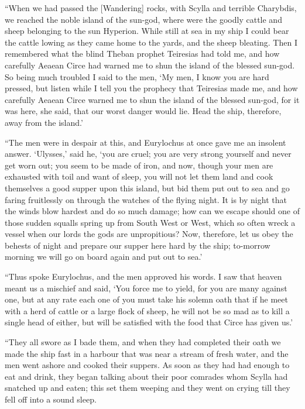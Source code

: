 “When we had passed the [Wandering] rocks, with Scylla and terrible Charybdis,
we reached the noble island of the sun-god, where were the goodly cattle and
sheep belonging to the sun Hyperion. While still at sea in my ship I could bear
the cattle lowing as they came home to the yards, and the sheep bleating. Then
I remembered what the blind Theban prophet Teiresias had told me, and how
carefully Aeaean Circe had warned me to shun the island of the blessed sun-god.
So being much troubled I said to the men, ‘My men, I know you are hard pressed,
but listen while I tell you the prophecy that Teiresias made me, and how
carefully Aeaean Circe warned me to shun the island of the blessed sun-god, for
it was here, she said, that our worst danger would lie. Head the ship,
therefore, away from the island.’

“The men were in despair at this, and Eurylochus at once gave me an insolent
answer. ‘Ulysses,’ said he, ‘you are cruel; you are very strong yourself and
never get worn out; you seem to be made of iron, and now, though your men are
exhausted with toil and want of sleep, you will not let them land and cook
themselves a good supper upon this island, but bid them put out to sea and go
faring fruitlessly on through the watches of the flying night. It is by night
that the winds blow hardest and do so much damage; how can we escape should one
of those sudden squalls spring up from South West or West, which so often wreck
a vessel when our lords the gods are unpropitious? Now, therefore, let us obey
the behests of night and prepare our supper here hard by the ship; to-morrow
morning we will go on board again and put out to sea.’

“Thus spoke Eurylochus, and the men approved his words. I saw that heaven meant
us a mischief and said, ‘You force me to yield, for you are many against one,
but at any rate each one of you must take his solemn oath that if he meet with
a herd of cattle or a large flock of sheep, he will not be so mad as to kill a
single head of either, but will be satisfied with the food that Circe has given
us.’

“They all swore as I bade them, and when they had completed their oath we made
the ship fast in a harbour that was near a stream of fresh water, and the men
went ashore and cooked their suppers. As soon as they had had enough to eat and
drink, they began talking about their poor comrades whom Scylla had snatched up
and eaten; this set them weeping and they went on crying till they fell off
into a sound sleep.

